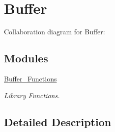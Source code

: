 \hypertarget{group__buffer}{}\section{Buffer}
\label{group__buffer}
Collaboration diagram for Buffer\+:
\subsection*{Modules}
\begin{DoxyCompactItemize}
\item 
\hyperlink{group___buffer___functions}{Buffer\+\_\+\+Functions}
\begin{DoxyCompactList}\small\item\em Library Functions. \end{DoxyCompactList}\end{DoxyCompactItemize}


\subsection{Detailed Description}
